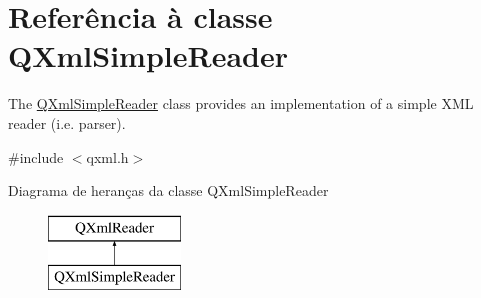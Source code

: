 \hypertarget{class_q_xml_simple_reader}{\section{Referência à classe Q\-Xml\-Simple\-Reader}
\label{class_q_xml_simple_reader}
}


The \hyperlink{class_q_xml_simple_reader}{Q\-Xml\-Simple\-Reader} class provides an implementation of a simple X\-M\-L reader (i.\-e. parser).  




{\ttfamily \#include $<$qxml.\-h$>$}

Diagrama de heranças da classe Q\-Xml\-Simple\-Reader\begin{figure}[H]
\begin{center}
\leavevmode
\includegraphics[height=2.000000cm]{class_q_xml_simple_reader}
\end{center}
\end{figure}
